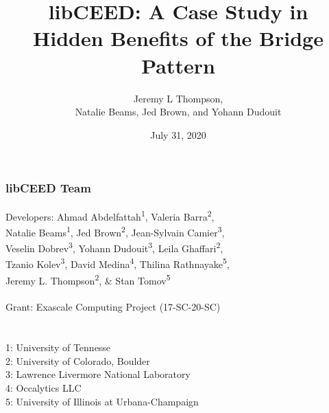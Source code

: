 \documentclass{beamer}
\title[libCEED Finite Element Library]{libCEED: A Case Study in\\Hidden Benefits of the Bridge Pattern} %
\author[Jeremy L Thompson]{Jeremy L Thompson,\\Natalie Beams, Jed Brown, and Yohann Dudouit} %
\institute[CU Boulder] %
{University of Colorado Boulder \\ %
\medskip
\textit{jeremy.thompson@colorado.edu} %
}
\date{July 31, 2020} %
\begin{document}
\begin{frame}
\titlepage %
\end{frame}


\begin{frame}
\begin{center}
\frametitle{libCEED Team}

{\flushleft

Developers: \hspace{2mm} Ahmad Abdelfattah\textsuperscript{1},
Valeria Barra\textsuperscript{2},\\
Natalie Beams\textsuperscript{1},
Jed Brown\textsuperscript{2},
Jean-Sylvain Camier\textsuperscript{3},\\
Veselin Dobrev\textsuperscript{3},
Yohann Dudouit\textsuperscript{3},
Leila Ghaffari\textsuperscript{2},\\
Tzanio Kolev\textsuperscript{3},
David Medina\textsuperscript{4},
Thilina Rathnayake\textsuperscript{5},\\
Jeremy L. Thompson\textsuperscript{2}, \&
Stan Tomov\textsuperscript{5}\\

~\\

Grant: \hspace{11mm} Exascale Computing Project (17-SC-20-SC)\\

~\\

~\\

\small{1: University of Tennesse\\
2: University of Colorado, Boulder\\
3: Lawrence Livermore National Laboratory\\
4: Occalytics LLC\\
5: University of Illinois at Urbana-Champaign\\}}

\end{center}
\end{frame}
\end{document}
